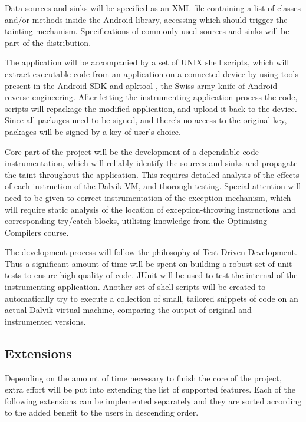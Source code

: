 \documentclass[12pt]{article}
\begin{document}
Data sources and sinks will be specified as an XML file containing a list
of classes and/or methods inside the Android library, accessing which
should trigger the tainting mechanism. Specifications of commonly used 
sources and sinks will be part of the distribution.

The application will be accompanied by a set of UNIX shell scripts, which 
will extract executable code from an application on a connected device 
by using tools present in the Android SDK and apktool 
\cite{code.google.com/p/android-apktool}, the Swiss army-knife of
Android reverse-engineering. After letting the instrumenting application
process the code, scripts will repackage the modified application, and 
upload it back to the device. Since all packages need to be signed, and
there's no access to the original key, packages will be signed by a 
key of user's choice.

Core part of the project will be the development of a dependable code 
instrumentation, which will reliably identify the sources and sinks and
propagate the taint throughout the application. This requires detailed
analysis of the effects of each instruction of the Dalvik VM, and 
thorough testing. Special attention will need to be given to correct 
instrumentation of the exception mechanism, which will require static 
analysis of the location of exception-throwing instructions and 
corresponding try/catch blocks, utilising knowledge from the Optimising
Compilers course.

The development process will follow the philosophy of Test Driven 
Development. Thus a significant amount of time will be spent on building 
a robust set of unit tests to ensure high quality of code. JUnit will be 
used to test the internal of the instrumenting application. Another set of 
shell scripts will be created to automatically try to execute a collection
of small, tailored snippets of code on an actual Dalvik virtual machine, 
comparing the output of original and instrumented versions.

\subsection*{Extensions}

Depending on the amount of time necessary to finish the core of the project,
extra effort will be put into extending the list of supported features. Each 
of the following extensions can be implemented separately and they are 
sorted according to the added benefit to the users in descending order.
\end{document}
